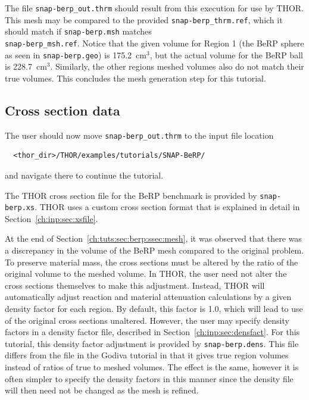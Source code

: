 The file \verb"snap-berp_out.thrm" should result from this execution for use by \ac{THOR}.
This mesh may be compared to the provided \verb"snap-berp_thrm.ref", which it should match if \verb"snap-berp.msh" matches \\
\verb"snap-berp_msh.ref".
Notice that the given volume for Region 1 (the BeRP sphere as seen in \verb"snap-berp.geo") is 175.2~cm$^3$, but the actual volume for the BeRP ball is 228.7~cm$^3$.
Similarly, the other regions meshed volumes also do not match their true volumes.
This concludes the mesh generation step for this tutorial.

\subsection{Cross section data}

The user should now move \verb"snap-berp_out.thrm" to the input file location
\begin{verbatim}
  <thor_dir>/THOR/examples/tutorials/SNAP-BeRP/
\end{verbatim}
and navigate there to continue the tutorial.

The \ac{THOR} cross section file for the BeRP benchmark is provided by \verb"snap-berp.xs".
\ac{THOR} uses a custom cross section format that is explained in detail in Section~\ref{ch:inp:sec:xsfile}.

At the end of Section~\ref{ch:tuts:sec:berp:ssec:mesh}, it was observed that there was a discrepancy in the volume of the BeRP mesh compared to the original problem.
To preserve material mass, the cross sections must be altered by the ratio of the original volume to the meshed volume.
In \ac{THOR}, the user need not alter the cross sections themselves to make this adjustment.
Instead, \ac{THOR} will automatically adjust reaction and material attenuation calculations by a given density factor for each region.
By default, this factor is 1.0, which will lead to use of the original cross sections unaltered.
However, the user may specify density factors in a density factor file, described in Section~\ref{ch:inp:sec:densfact}.
For this tutorial, this density factor adjustment is provided by \verb"snap-berp.dens".
This file differs from the file in the Godiva tutorial in that it gives true region volumes instead of ratios of true to meshed volumes.
The effect is the same, however it is often simpler to specify the density factors in this manner since the density file will then need not be changed as the mesh is refined.

